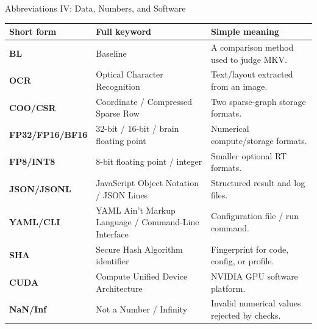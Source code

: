 \documentclass[aspectratio=169,10pt]{beamer}
\begin{document}
\begin{frame}{Abbreviations IV: Data, Numbers, and Software}
\scriptsize
\begin{tabularx}{\textwidth}{>{\bfseries}p{}p{}X}
\toprule
Short form & Full keyword & Simple meaning \\
\midrule
BL & Baseline & A comparison method used to judge MKV. \\
OCR & Optical Character Recognition & Text/layout extracted from an image. \\
COO/CSR & Coordinate / Compressed Sparse Row & Two sparse-graph storage formats. \\
FP32/FP16/BF16 & 32-bit / 16-bit / brain floating point & Numerical compute/storage formats. \\
FP8/INT8 & 8-bit floating point / integer & Smaller optional RT formats. \\
JSON/JSONL & JavaScript Object Notation / JSON Lines & Structured result and log files. \\
YAML/CLI & YAML Ain't Markup Language / Command-Line Interface & Configuration file / run command. \\
SHA & Secure Hash Algorithm identifier & Fingerprint for code, config, or profile. \\
CUDA & Compute Unified Device Architecture & NVIDIA GPU software platform. \\
NaN/Inf & Not a Number / Infinity & Invalid numerical values rejected by checks. \\
\bottomrule
\end{tabularx}
\end{frame}
\end{document}
